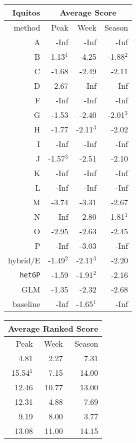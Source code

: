 \documentclass[12pt]{article}
\begin{document}
\begin{table}[ht!]
\footnotesize
\begin{minipage}{6.5cm}
\begin{tabular}{r|rrr}
 Iquitos & \multicolumn{3}{c}{Average Score} \\
  \hline
 method & Peak & Week & Season \\ 
  \hline
  A & -Inf & -Inf & -Inf \\ 
  B & -1.13$^1$ & -4.25 & -1.88$^2$ \\ 
  C & -1.68 & -2.49 & -2.11 \\ 
  D & -2.67 & -Inf & -Inf \\ 
  F & -Inf & -Inf & -Inf \\ 
  G & -1.53 & -2.40 & -2.01$^3$ \\ 
  H & -1.77 & -2.11$^{3 }$ & -2.02 \\ 
  I & -Inf & -Inf & -Inf \\ 
  J & -1.57$^3$ & -2.51 & -2.10 \\ 
  K & -Inf & -Inf & -Inf \\ 
  L & -Inf & -Inf & -Inf \\ 
  M & -3.74 & -3.31 & -2.67 \\ 
  N & -Inf & -2.80 & -1.81$^1$ \\ 
  O & -2.95 & -2.63 & -2.45 \\ 
  P & -Inf & -3.03 & -Inf \\ 
  hybrid/E & -1.49$^2$ & -2.11$^{3}$ & -2.20 \\ 
  {\tt hetGP} & -1.59 & -1.91$^2$ & -2.16 \\ 
  GLM & -1.35 & -2.32 & -2.68 \\ 
    baseline & -Inf & -1.65$^1$ & -Inf \\ 
   \hline
\end{tabular}
\end{minipage}
\hfill
\begin{minipage}{4.5cm}
\begin{tabular}{rrr}
 \multicolumn{3}{c}{Average Ranked Score} \\
  \hline
  Peak & Week & Season \\ 
  \hline
  4.81 & 2.27 & 7.31 \\ 
  15.54$^1$ & 7.15 & 14.00 \\ 
  12.46 & 10.77 & 13.00 \\ 
  12.31 & 4.88 & 7.69 \\ 
  9.19 & 8.00 & 3.77 \\ 
  13.08 & 11.00 & 14.15 \\ 

\end{tabular}
\end{minipage}
\end{table}
\end{document}
